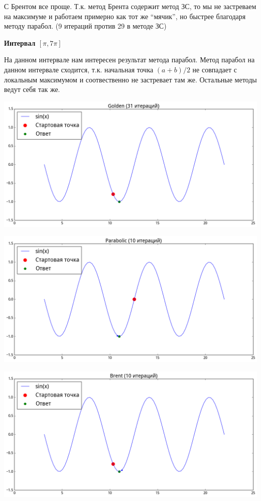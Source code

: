 \documentclass[12pt, a4paper]{article}
\begin{document}
        С Брентом все проще. Т.к. метод Брента содержит метод ЗС, то мы не застреваем на максимуме и работаем примерно как тот же ``мячик'', но быстрее благодаря методу парабол. (9 итераций против 29 в методе ЗС)



        \textbf{Интервал $[\pi, 7\pi]$}

        На данном интервале нам интересен результат метода парабол. Метод парабол на данном интервале сходится, т.к. начальная точка $(a + b) / 2$ не совпадает с локальным максимумом и соотвественно не застревает там же. Остальные методы ведут себя так же.

        \begin{center}\includegraphics[width=\picwidth, height=\picheight]{pics/sin_golden_7p.png}\end{center}

        \begin{center}\includegraphics[width=\picwidth, height=\picheight]{pics/sin_parabolic_7p.png}\end{center}

        \begin{center}\includegraphics[width=\picwidth, height=\picheight]{pics/sin_brent_7p.png}\end{center}
\end{document}
